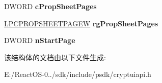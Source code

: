 \begin{DoxyCompactItemize}
D\+W\+O\+RD {\bfseries c\+Prop\+Sheet\+Pages}
\item 
\mbox{\label{structtag_c_r_y_p_t_u_i___v_i_e_w_c_e_r_t_i_f_i_c_a_t_e___s_t_r_u_c_t_w_a6e472570e5c7d02443ab33f29bed7690}} 
\hyperlink{struct___p_r_o_p_s_h_e_e_t_p_a_g_e_w}{L\+P\+C\+P\+R\+O\+P\+S\+H\+E\+E\+T\+P\+A\+G\+EW} {\bfseries rg\+Prop\+Sheet\+Pages}
\item 
\mbox{\label{structtag_c_r_y_p_t_u_i___v_i_e_w_c_e_r_t_i_f_i_c_a_t_e___s_t_r_u_c_t_w_a6a321de90a4cb57652587941476d9ede}} 
D\+W\+O\+RD {\bfseries n\+Start\+Page}
\end{DoxyCompactItemize}


该结构体的文档由以下文件生成\+:\begin{DoxyCompactItemize}
\item 
E\+:/\+React\+O\+S-\/0../sdk/include/psdk/cryptuiapi.\+h\end{DoxyCompactItemize}
